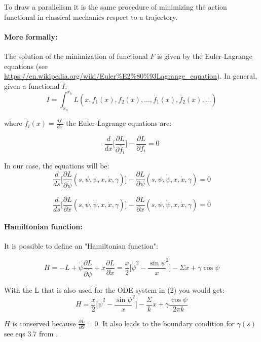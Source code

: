 \documentclass[12pt]{article}
\begin{document}
To draw a parallelism it is the same procedure of minimizing the action functional in classical mechanics respect to a trajectory.



\paragraph*{More formally:} 


The solution of the minimization of functional $F$ is given by the Euler-Lagrange equations (see \url{https://en.wikipedia.org/wiki/Euler%E2%80%93Lagrange_equation}). In general, given a functional $I$:
$$I=\int_{x_a}^{x_b}L(x,f_1(x),f_2(x),\dots,\dot{f_1}(x),\dot{f_2}(x),\dots)$$

where $\dot{f_i}(x)=\frac{df_i}{dx}$ the Euler-Lagrange equations are:

$$
\frac{d}{dx}\bigg[ \frac{\partial L}{\partial \dot{f_i}} \bigg] - \frac{\partial L}{\partial f_i} = 0
$$


In our case, the equations will be:
$$
\frac{d}{ds}\bigg[ \frac{\partial L}{\partial \dot{\psi}}(s,\psi,\dot{\psi},x,\dot{x},\gamma) \bigg] - \frac{\partial L}{\partial \psi}(s,\psi,\dot{\psi},x,\dot{x},\gamma) = 0
$$

$$
\frac{d}{ds}\bigg[ \frac{\partial L}{\partial \dot{x}}(s,\psi,\dot{\psi},x,\dot{x},\gamma) \bigg] - \frac{\partial L}{\partial x}(s,\psi,\dot{\psi},x,\dot{x},\gamma) = 0
$$

\paragraph*{Hamiltonian function:}
It is possible to define an "Hamiltonian function":

\begin{equation*}
    H = -L + \dot{\psi} \frac{\partial L}{\partial \dot{\psi}} + \dot{x} \frac{\partial L}{\partial \dot{x}}
    = \frac{x}{2} \bigg[  \dot{\psi}^2 - \frac{\sin \psi}{x}^2 \bigg] - \Sigma x + \gamma \cos \psi
\end{equation*}

\alert{With the L that is also used for the ODE system in (2) you would get: 
\begin{equation*}
    H = \frac{x}{2} \bigg[  \dot{\psi}^2 - \frac{\sin \psi}{x}^2 \bigg] - \frac{\Sigma}{k} x + \gamma \frac{\cos \psi}{2\pi k}
\end{equation*}
}

$H$ is conserved because $\frac{\partial L}{\partial S} = 0$. It also leads to the boundary condition for $\gamma(s)$ see eqs 3.7 from \cite{seifertShapeTransformationsVesicles1991}.
\end{document}
